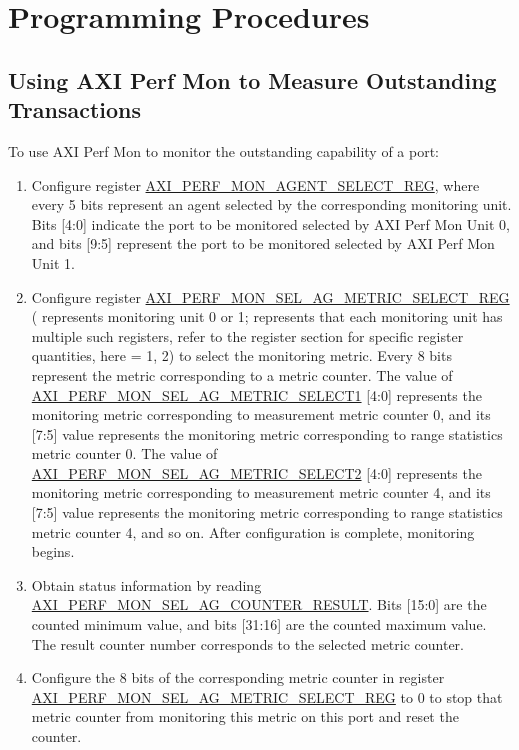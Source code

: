 \documentclass[main\_\_EN.tex]{subfiles}
\begin{document}
\section{Programming Procedures}
\label{sec:aximon-prog-procedures}

\subsection{Using AXI Perf Mon to Measure Outstanding Transactions}
To use AXI Perf Mon to monitor the outstanding capability of a port:
\begin{enumerate}
    \item Configure register \hyperref[regdesc:AXIPERFMONAGENTSELECTREG]{AXI\_PERF\_MON\_AGENT\_SELECT\_REG}, where every 5 bits represent an agent selected by the corresponding monitoring unit. Bits [4:0] indicate the port to be monitored selected by AXI Perf Mon Unit 0, and bits [9:5] represent the port to be monitored selected by AXI Perf Mon Unit 1.
    \item Configure register \hyperref[regdesc:AXIPERFMONSELAGNMETRICSELECTMREG]{AXI\_PERF\_MON\_SEL\_AG\_METRIC\_SELECT\_REG} ( represents monitoring unit 0 or 1;  represents that each monitoring unit has multiple such registers, refer to the register section for specific register quantities, here  = 1, 2) to select the monitoring metric. Every 8 bits represent the metric corresponding to a metric counter. The value of \hyperref[fielddesc:AXIPERFMONSELAGNMETRICSELECTM]{AXI\_PERF\_MON\_SEL\_AG\_METRIC\_SELECT1} [4:0] represents the monitoring metric corresponding to measurement metric counter 0, and its [7:5] value represents the monitoring metric corresponding to range statistics metric counter 0. The value of \hyperref[fielddesc:AXIPERFMONSELAGNMETRICSELECTM]{AXI\_PERF\_MON\_SEL\_AG\_METRIC\_SELECT2} [4:0] represents the monitoring metric corresponding to measurement metric counter 4, and its [7:5] value represents the monitoring metric corresponding to range statistics metric counter 4, and so on.
    After configuration is complete, monitoring begins.
    \item Obtain status information by reading \hyperref[fielddesc:AXIPERFMONSELAGNCOUNTERMRESULT]{AXI\_PERF\_MON\_SEL\_AG\_COUNTER\_RESULT}. Bits [15:0] are the counted minimum value, and bits [31:16] are the counted maximum value. The result counter number corresponds to the selected metric counter. 
    \item Configure the 8 bits of the corresponding metric counter in register \hyperref[regdesc:AXIPERFMONSELAGNMETRICSELECTMREG]{AXI\_PERF\_MON\_SEL\_AG\_METRIC\_SELECT\_REG} to 0 to stop that metric counter from monitoring this metric on this port and reset the counter.
\end{enumerate}
\end{document}
